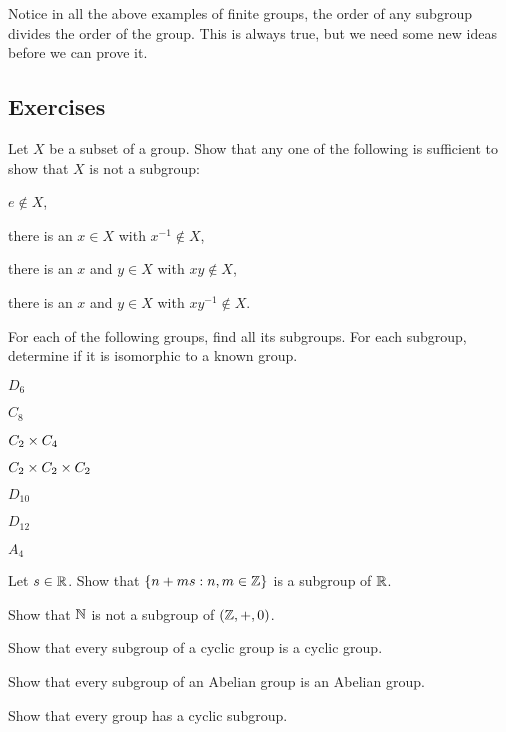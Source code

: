 Notice in all the above examples of finite groups, the order of any
subgroup divides the order of the group.  This is always true, but we
need some new ideas before we can prove it.

\subsection*{Exercises}

\begin{exercises}
  \item Let $X$ be a subset of a group.  Show that any one of the 
    following is sufficient to show that $X$ is not a subgroup:
    \begin{theoremenum}
      \item $e \notin X$,
      
      \item there is an $x \in X$ with $x^{-1} \notin X$,
      
      \item there is an $x$ and $y \in X$ with $xy \notin X$,
      
      \item there is an $x$ and $y \in X$ with $xy^{-1} \notin X$.
    \end{theoremenum}
  
  \item For each of the following groups, find all its subgroups.  
    For each subgroup, determine if it is isomorphic to a known group.
    \begin{theoremenum}
      \item $D_{6}$
      
      \item $C_{8}$
    
      \item $C_{2} \times C_{4}$
      
      \item $C_{2} \times C_{2} \times C_{2}$
      
      \item $D_{10}$

      \item $D_{12}$
      
      \item $A_{4}$
    \end{theoremenum}
    
  \item Let $s \in \mathbb{R}$.  Show that $\{ n + ms : n, m \in \mathbb{Z}\}$
    is a subgroup of $\mathbb{R}$.
  
  \item Show that $\mathbb{N}$ is not a subgroup of $(\mathbb{Z}, +, 0)$.
  
  \item Show that every subgroup of a cyclic group is a cyclic
    group.
  
    Show that every subgroup of an Abelian group is an Abelian
    group.
    
  \item Show that every group has a cyclic subgroup.
\end{exercises}

